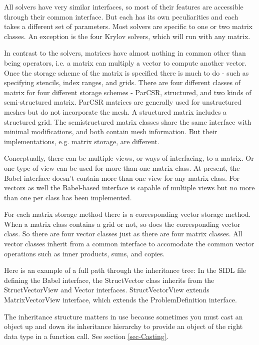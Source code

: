 All solvers have very similar interfaces, so most of their features
are accessible through their common  interface. But each
has its own peculiarities and each takes a different set of
parameters.  Most solvers are specific to one or two matrix classes.
An exception is the four Krylov solvers, which will run with any
matrix.

In contrast to the solvers, matrices have almost nothing in common
other than being operators, i.e. a matrix can multiply a vector to
compute another vector.  Once the storage scheme of the matrix is
specified there is much to do - such as specifying stencils, index
ranges, and grids.  There are four different classes of matrix for
four different storage schemes - ParCSR, structured, and two kinds of
semi-structured matrix.  ParCSR matrices are generally used for
unstructured meshes but do not incorporate the mesh.  A structured
matrix includes a structured grid.  The semistructured matrix classes
share the same interface with minimal modifications, and both contain
mesh information. But their implementations, e.g. matrix storage, are
different.

Conceptually, there can be multiple views, or ways of interfacing, to
a matrix.  Or one type of view can be used for more than one matrix
class.  At present, the Babel interface doesn't contain more than one
view for any matrix class.  For vectors as well the Babel-based
interface is capable of multiple views but no more than one per class
has been implemented.

For each matrix storage method there is a corresponding vector storage
method.  When a matrix class contains a grid or not, so does the
corresponding vector class.  So there are four vector classes just as
there are four matrix classes.  All vector classes inherit from a
common interface to accomodate the common vector operations such as
inner products, sums, and copies.

Here is an example of a full path through the inheritance tree: In the
SIDL file defining the Babel interface, the StructVector class
inherits from the StructVectorView and Vector interfaces.
StructVectorView extends MatrixVectorView interface, which extends the
ProblemDefinition interface.


The inheritance structure matters in use because sometimes you must
cast an object up and down its inheritance hierarchy to provide an
object of the right data type in a function call.  See section
\ref{sec-Casting}.



